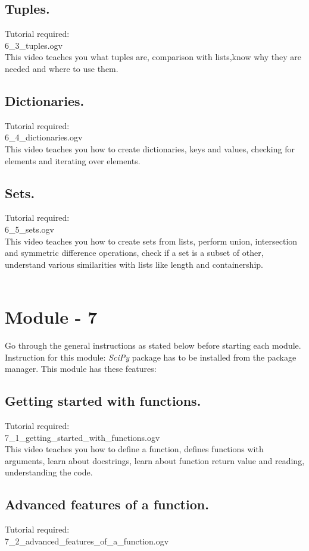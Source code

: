 \documentclass[11pt,twocolumn]{article}
\begin{document}
\subsection{Tuples.}
Tutorial required: \\ 6\_3\_tuples.ogv \\

This video teaches you what tuples are, comparison with lists,know why they are needed and where to use them. 
\subsection{Dictionaries.}
Tutorial required: \\ 6\_4\_dictionaries.ogv \\

This video teaches you how to create dictionaries, keys and values, checking for elements and iterating over elements. 
\subsection{Sets.}
Tutorial required: \\ 6\_5\_sets.ogv \\

This video teaches you how to create sets from lists, perform union, intersection and symmetric difference operations, check if a set is a subset of other, understand various similarities with lists like length and containership.\\ \\


\section{Module - 7}
Go through the general instructions as stated below before starting each module.
Instruction for this module: \emph{SciPy} package has to be installed from the package manager. 
This module has these features:
\subsection{Getting started with functions.}
Tutorial required: \\ 7\_1\_getting\_started\_with\_functions.ogv \\
This video teaches you how to define a function, defines functions with arguments, learn about docstrings, learn about function return value and reading, understanding the code.
\subsection{Advanced features of a function.}
Tutorial required: \\ 7\_2\_advanced\_features\_of\_a\_function.ogv \\
\end{document}
